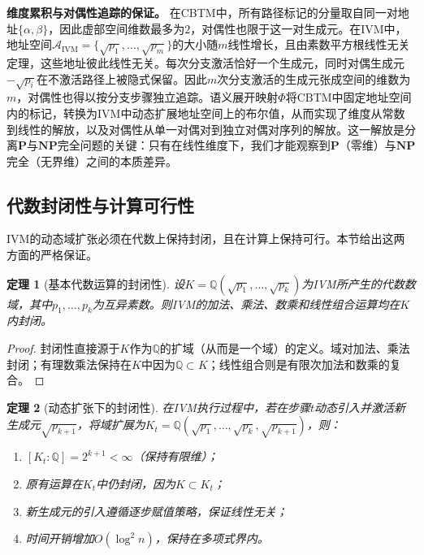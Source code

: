 \documentclass{ctexart}
\newtheorem{theorem}{定理}[section]
\newtheorem{proof}[theorem]{证明}
\begin{document}
	\textbf{维度累积与对偶性追踪的保证。} 在CBTM中，所有路径标记的分量取自同一对地址$\{\alpha, \beta\}$，因此虚部空间维数最多为$2$，对偶性也限于这一对生成元。在IVM中，地址空间$\mathcal{A}_{\text{IVM}} = \{\sqrt{p_1}, \dots, \sqrt{p_m}\}$的大小随$m$线性增长，且由素数平方根线性无关定理，这些地址彼此线性无关。每次分支激活恰好一个生成元，同时对偶生成元$-\sqrt{p_i}$在不激活路径上被隐式保留。因此$m$次分支激活的生成元张成空间的维数为$m$，对偶性也得以按分支步骤独立追踪。语义展开映射$\Phi$将CBTM中固定地址空间内的标记，转换为IVM中动态扩展地址空间上的布尔值，从而实现了维度从常数到线性的解放，以及对偶性从单一对偶对到独立对偶对序列的解放。这一解放是分离$\mathbf{P}$与$\mathbf{NP}$完全问题的关键：只有在线性维度下，我们才能观察到$\mathbf{P}$（零维）与$\mathbf{NP}$完全（无界维）之间的本质差异。
	
	\subsection{代数封闭性与计算可行性}
	
	IVM的动态域扩张必须在代数上保持封闭，且在计算上保持可行。本节给出这两方面的严格保证。
	
	\begin{theorem}[基本代数运算的封闭性]\label{thm:basic-closure}
		设$K = \mathbb{Q}(\sqrt{p_1},\dots,\sqrt{p_k})$为IVM所产生的代数数域，其中$p_1,\dots,p_k$为互异素数。则IVM的加法、乘法、数乘和线性组合运算均在$K$内封闭。
	\end{theorem}
	\begin{proof}
		封闭性直接源于$K$作为$\mathbb{Q}$的扩域（从而是一个域）的定义。域对加法、乘法封闭；有理数乘法保持在$K$中因为$\mathbb{Q}\subset K$；线性组合则是有限次加法和数乘的复合。
	\end{proof}
	
	\begin{theorem}[动态扩张下的封闭性]\label{thm:dynamic-closure}
		在IVM执行过程中，若在步骤$t$动态引入并激活新生成元$\sqrt{p_{k+1}}$，将域扩展为$K_t = \mathbb{Q}(\sqrt{p_1},\dots,\sqrt{p_k},\sqrt{p_{k+1}})$，则：
		\begin{enumerate}
			\item $[K_t:\mathbb{Q}] = 2^{k+1} < \infty$（保持有限维）；
			\item 原有运算在$K_t$中仍封闭，因为$K\subset K_t$；
			\item 新生成元的引入遵循逐步赋值策略，保证线性无关；
			\item 时间开销增加$O(\log^2 n)$，保持在多项式界内。
		\end{enumerate}
	\end{theorem}
	
\end{document}
